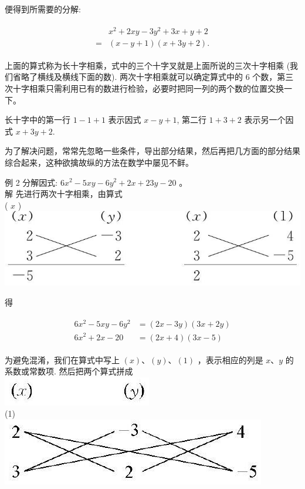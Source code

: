 \documentclass[10pt]{article}
\begin{document}
便得到所需要的分解:

\begin{align*}
\begin{aligned}
& x^{2}+2 x y-3 y^{2}+3 x+y+2 \\
= & (x-y+1)(x+3 y+2) .
\end{aligned}
\end{align*}

上面的算式称为长十字相乘，式中的三个十字叉就是上面所说的三次十字相乘 (我们省略了横线及横线下面的数). 两次十字相乘就可以确定算式中的 6 个数，第三次十字相乘只需利用已有的数进行检验，必要时把同一列的两个数的位置交换一下。

长十字中的第一行 $1-1+1$ 表示因式 $x-y+1$, 第二行 $1+3+2$ 表示另一个因式 $x+3 y+2$.

为了解决问题，常常先忽略一些条件，导出部分结果，然后再把几方面的部分结果综合起来，这种欲擒故纵的方法在数学中屡见不鲜。

例 2 分解因式: $6 x^{2}-5 x y-6 y^{2}+2 x+23 y-20$ 。\\
解 先进行两次十字相乘，由算式\\
( $x$ )\\
\includegraphics[max width=\textwidth, center]{2024_10_30_bd799899fef40368a068g-042(1)}

得

\begin{align*}
\begin{aligned}
6 x^{2}-5 x y-6 y^{2} & =(2 x-3 y)(3 x+2 y) \\
6 x^{2}+2 x-20 & =(2 x+4)(3 x-5)
\end{aligned}
\end{align*}

为避免混淆，我们在算式中写上 $(x) 、(y) 、(1)$ ，表示相应的列是 $x 、 y$ 的系数或常数项. 然后把两个算式拼成\\
\includegraphics[max width=\textwidth, center]{2024_10_30_bd799899fef40368a068g-042(3)}\\
(1)\\
\includegraphics[max width=\textwidth, center]{2024_10_30_bd799899fef40368a068g-042(2)}
\end{document}
